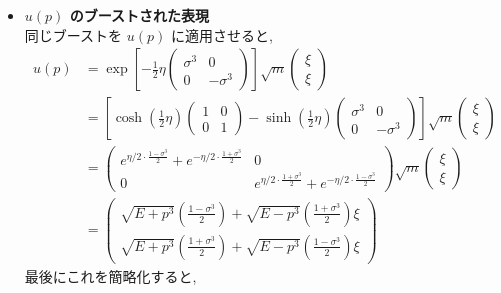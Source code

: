 \documentclass[a4paper,12pt]{article}
\begin{document}
\begin{itemize}
  \item \textbf{$u(p)$ のブーストされた表現}\\
  同じブーストを $u(p)$ に適用させると,
  \begin{align*}
    u(p) &= \exp\left[
      -\frac{1}{2} \eta
      \begin{pmatrix}
        \sigma^3 & 0 \\
        0 & -\sigma^3
      \end{pmatrix}
    \right]
    \sqrt{m}
    \begin{pmatrix}
      \xi \\
      \xi
    \end{pmatrix} \\
    &=
    \left[
      \cosh\left( \frac{1}{2} \eta \right)
      \begin{pmatrix}
        1 & 0 \\
        0 & 1
      \end{pmatrix}
      -
      \sinh\left( \frac{1}{2} \eta \right)
      \begin{pmatrix}
        \sigma^3 & 0 \\
        0 & -\sigma^3
      \end{pmatrix}
    \right]
    \sqrt{m}
    \begin{pmatrix}
      \xi \\
      \xi
    \end{pmatrix} \\
    &= \begin{pmatrix}
        e^{\eta/2 \cdot \frac{1 - \sigma^3}{2}} + e^{-\eta/2 \cdot \frac{1 + \sigma^3}{2}} & 0\\
        0 & e^{\eta/2 \cdot \frac{1 + \sigma^3}{2}} + e^{-\eta/2 \cdot \frac{1 - \sigma^3}{2}}
      \end{pmatrix}
    \sqrt{m}
    \begin{pmatrix}
      \xi \\
      \xi
    \end{pmatrix} \\
    &= \begin{pmatrix}
        \sqrt{E + p^3} \left( \frac{1 - \sigma^3}{2} \right)
        + \sqrt{E - p^3} \left( \frac{1 + \sigma^3}{2} \right)\xi \\
         \sqrt{E + p^3} \left( \frac{1 + \sigma^3}{2} \right)
        + \sqrt{E - p^3} \left( \frac{1 - \sigma^3}{2} \right)\xi
      \end{pmatrix} \tag{3.49}
  \end{align*}
  最後にこれを簡略化すると,
  \begin{equation*}

\end{equation*}
\end{itemize}
\end{document}

